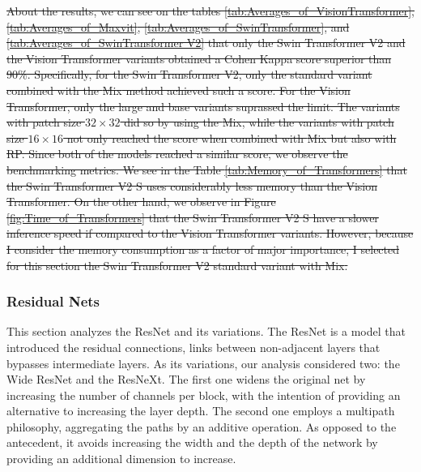 \sout{
About the results, we can see on the tables \ref{tab:Averages_of_VisionTransformer}, \ref{tab:Averages_of_Maxvit}, \ref{tab:Averages_of_SwinTransformer}, and \ref{tab:Averages_of_SwinTransformer V2} that only the Swin Transformer V2 and the Vision Transformer variants obtained a Cohen Kappa score superior than 90\%. Specifically, for the Swin Transformer V2, only the standard variant combined with the \gls{Mix} method achieved such a score. For the Vision Transformer, only the large and base variants suprassed the limit. The variants with patch size $32\times 32$ did so by using the \gls{Mix}, while the variants with patch size $16 \times 16$ not only reached the score when combined with \gls{Mix} but also with \gls{RP}. Since both of the models reached a similar score, we observe the benchmarking metrics. We see in the Table \ref{tab:Memory_of_Transformers} that the Swin Transformer V2 S uses considerably less memory than the Vision Transformer. On the other hand, we observe in Figure \ref{fig:Time_of_Transformers} that the Swin Transformer V2 S have a slower inference speed if compared to the Vision Transformer variants. However, because I consider the memory consumption as a factor of major importance, I selected for this section the Swin Transformer V2 standard variant with \gls{Mix}.
}






\FloatBarrier

\subsubsection{Residual Nets}

This section analyzes the ResNet and its variations. The ResNet is a model that introduced the residual connections, links between non-adjacent layers that bypasses intermediate layers. As its variations, our analysis considered two: the Wide ResNet and the ResNeXt. The first one widens the original net by increasing the number of channels per block, with the intention of providing an alternative to increasing the layer depth. The second one employs a multipath philosophy, aggregating the paths by an additive operation. As opposed to the antecedent, it avoids increasing the width and the depth of the network by providing an additional dimension to increase. 

